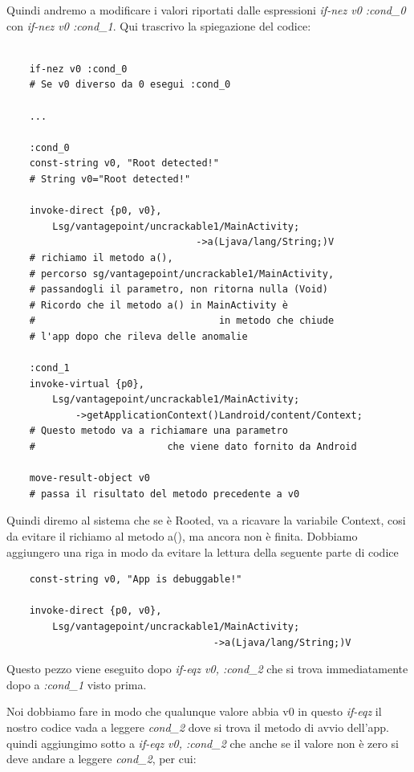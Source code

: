 \documentclass{article}
\begin{document}
Quindi andremo a modificare i valori riportati dalle espressioni \textit{if-nez v0 :cond\_0} con \textit{if-nez v0 :cond\_1}. Qui trascrivo la spiegazione del codice:
\begin{verbatim}

    if-nez v0 :cond_0
    # Se v0 diverso da 0 esegui :cond_0 
    
    ...
    
    :cond_0
    const-string v0, "Root detected!"
    # String v0="Root detected!"
    
    invoke-direct {p0, v0}, 
        Lsg/vantagepoint/uncrackable1/MainActivity;
                                 ->a(Ljava/lang/String;)V
    # richiamo il metodo a(), 
    # percorso sg/vantagepoint/uncrackable1/MainActivity, 
    # passandogli il parametro, non ritorna nulla (Void)
    # Ricordo che il metodo a() in MainActivity è 
    #                                in metodo che chiude
    # l'app dopo che rileva delle anomalie

    :cond_1
    invoke-virtual {p0}, 
        Lsg/vantagepoint/uncrackable1/MainActivity;
            ->getApplicationContext()Landroid/content/Context;
    # Questo metodo va a richiamare una parametro 
    #                       che viene dato fornito da Android    
    
    move-result-object v0
    # passa il risultato del metodo precedente a v0

\end{verbatim}
Quindi diremo al sistema che se è Rooted, va a ricavare la variabile Context, cosi da evitare il richiamo al metodo a(), ma ancora non è finita.
Dobbiamo aggiungero una riga in modo da evitare la lettura della seguente parte di codice
\begin{verbatim}
    const-string v0, "App is debuggable!"

    invoke-direct {p0, v0}, 
        Lsg/vantagepoint/uncrackable1/MainActivity;
                                    ->a(Ljava/lang/String;)V
\end{verbatim}
Questo pezzo viene eseguito dopo \emph{if-eqz v0, :cond\_2} che si trova immediatamente dopo a \emph{:cond\_1} visto prima. 

Noi dobbiamo fare in modo 
che qualunque valore abbia v0 in questo \textit{if-eqz} il nostro codice vada a leggere \emph{cond\_2} dove si trova il metodo di avvio dell'app.
quindi aggiungimo sotto a \emph{if-eqz v0, :cond\_2} che anche se il valore non è zero si deve andare a leggere \emph{cond\_2}, per cui:
\end{document}
